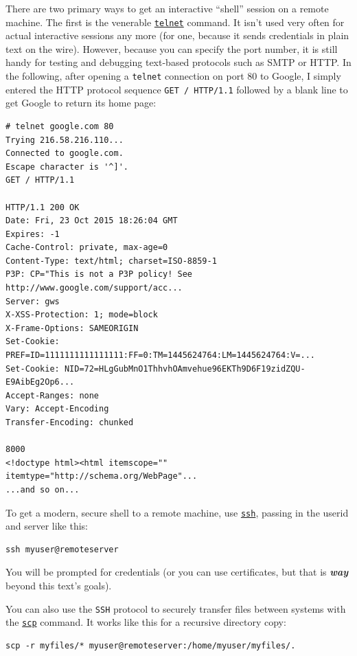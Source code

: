 \documentclass[10pt,]{book}
\numberwithin{figure}{chapter}
\begin{document}
There are two primary ways to get an interactive ``shell'' session on a
remote machine. The first is the venerable
\href{http://linux.die.net/man/1/telnet}{\texttt{telnet}} command. It
isn't used very often for actual interactive sessions any more (for one,
because it sends credentials in plain text on the wire). However,
because you can specify the port number, it is still handy for testing
and debugging text-based protocols such as SMTP or HTTP. In the
following, after opening a \texttt{telnet} connection on port 80 to
Google, I simply entered the HTTP protocol sequence
\texttt{GET / HTTP/1.1} followed by a blank line to get Google to return
its home page:

\begin{verbatim}
# telnet google.com 80
Trying 216.58.216.110...
Connected to google.com.
Escape character is '^]'.
GET / HTTP/1.1

HTTP/1.1 200 OK
Date: Fri, 23 Oct 2015 18:26:04 GMT
Expires: -1
Cache-Control: private, max-age=0
Content-Type: text/html; charset=ISO-8859-1
P3P: CP="This is not a P3P policy! See http://www.google.com/support/acc...
Server: gws
X-XSS-Protection: 1; mode=block
X-Frame-Options: SAMEORIGIN
Set-Cookie: PREF=ID=1111111111111111:FF=0:TM=1445624764:LM=1445624764:V=...
Set-Cookie: NID=72=HLgGubMnO1ThhvhOAmvehue96EKTh9D6F19zidZQU-E9AibEg2Op6...
Accept-Ranges: none
Vary: Accept-Encoding
Transfer-Encoding: chunked

8000
<!doctype html><html itemscope="" itemtype="http://schema.org/WebPage"...
...and so on...
\end{verbatim}

To get a modern, secure shell to a remote machine, use
\href{http://linux.die.net/man/1/ssh}{\texttt{ssh}}, passing in the
userid and server like this:

\begin{verbatim}
ssh myuser@remoteserver
\end{verbatim}

You will be prompted for credentials (or you can use certificates, but
that is \textbf{\emph{way}} beyond this text's goals).

You can also use the \texttt{SSH} protocol to securely transfer files
between systems with the \href{linux.die.net/man/1/scp}{\texttt{scp}}
command. It works like this for a recursive directory copy:

\begin{verbatim}
scp -r myfiles/* myuser@remoteserver:/home/myuser/myfiles/.
\end{verbatim}
\end{document}
